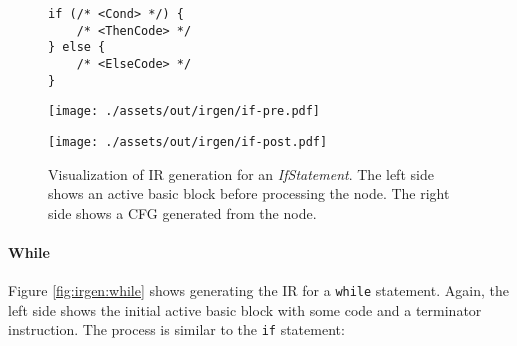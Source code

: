 \begin{figure}[!b]
    \begin{minipage}[t]{1\textwidth}
        \begin{minipage}{0.7\textwidth}
            \begin{verbatim}
if (/* <Cond> */) {
    /* <ThenCode> */
} else {
    /* <ElseCode> */
}
            \end{verbatim}
        \end{minipage}
    \end{minipage}
    \vspace{0.5cm}

    \begin{minipage}[t]{0.49\textwidth}
        \vspace*{0mm}
        \centering
        \texttt{[image: ./assets/out/irgen/if-pre.pdf]}
    \end{minipage}
    \begin{minipage}[t]{0.49\textwidth}
        \vspace*{0mm}
        \centering
        \texttt{[image: ./assets/out/irgen/if-post.pdf]}
    \end{minipage}

    \caption{Visualization of IR generation for an \textit{IfStatement}. The left side shows an active basic block before processing the node. The right side shows a CFG generated from the node.}
    \label{fig:irgen:if}
\end{figure}


\pagebreak
\paragraph{While} Figure \ref{fig:irgen:while} shows generating the IR for a \texttt{while} statement. Again, the left side shows the initial active basic block with some code and a terminator instruction. The process is similar to the \texttt{if} statement:

